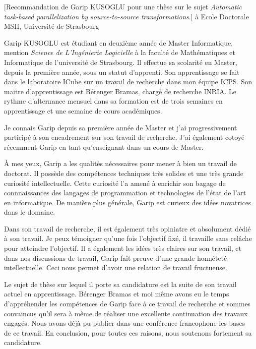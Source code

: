\documentclass[a4paper,10pt]{article}
\begin{document}

\begin{letter}[Recommandation de Garip \textsc{KUSOGLU} pour une thèse sur le
  sujet \textit{Automatic task-based parallelization by source-to-source transformations}.]%
  {à}%
  {Ecole Doctorale MSII, Université de Strasbourg}


Garip KUSOGLU  est étudiant  en deuxième année  de Master  Informatique, mention
\textit{Science de  L'Ingénierie Logicielle}  à la  faculté de  Mathématiques et
Informatique de l'université de Strasbourg.  Il effectue sa scolarité en Master,
depuis la première  année, sous un statut d'apprenti. Son  apprentissage se fait
dans le laboratoire ICube sur un travail de recherche dans mon équipe ICPS.  Son
maitre d'apprentissage est Bérenger Bramas, chargé de recherche INRIA. Le rythme
d'alternance mensuel dans sa formation est de trois semaines en apprentissage et
une semaine de cours académiques.
  
  Je connais  Garip depuis sa première  année de Master et  j'ai progressivement
  participé  à son  encadrement sur  son  travail de  recherche. J'ai  également
  cotoyé  récemment Garip  en  tant  qu'enseignant dans un  cours  de Master.

À mes yeux, Garip a les qualités nécessaires pour mener à bien un travail de
doctorat. Il  possède des compétences techniques très solides et une très grande
curiosité intellectuelle. Cette curiosité l'a amené à enrichir son bagage de
connnaissances des langages  de programmation et technologies de l'état de l'art
en informatique. De manière plus générale, Garip est curieux des idées
novatrices dans le domaine.

Dans son travail de recherche, il est également très
opiniatre et absolument dédié à son travail. Je peux témoigner qu'une fois
l'objectif fixé, il travaille sans relâche pour atteindre l'objectif. Il a
également les idées très claires sur son travail, et dans nos discussions de
travail, Garip fait preuve d'une grande honnêteté intellectuelle. Ceci nous permet
d'avoir une relation de travail fructueuse.

Le sujet de thèse sur lequel il porte sa candidature est la suite de son travail
actuel en apprentissage. Bérenger Bramas et moi même avons eu le temps
d'appréhender les compétences de Garip face à ce travail de recherche et sommes
convaincus qu'il sera à même de réaliser une excellente continuation des travaux
engagés. Nous avons déjà pu publier dans une conférence francophone les bases de
ce travail. 
En conclusion, pour toutes ces raisons, nous soutenons fortement sa candidature.


\end{letter}
\end{document}
